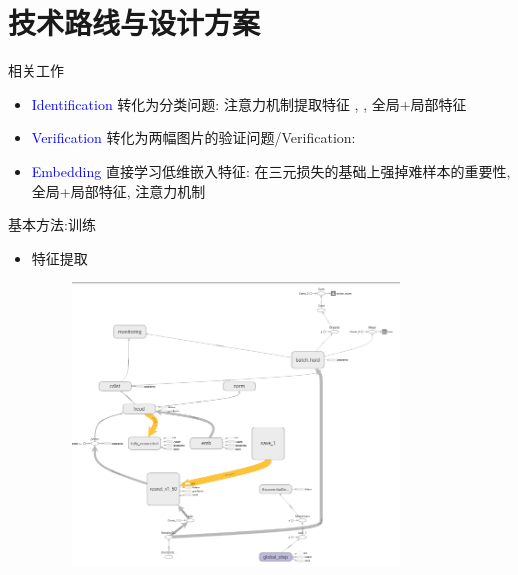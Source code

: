 \documentclass[notes]{beamer}
\begin{document}
\section{技术路线与设计方案}

\begin{frame}
	{相关工作}
	\begin{itemize}
		\item {\textcolor{blue}{Identification}} 转化为分类问题: 注意力机制提取特征 \cite{liu2017hydraplus}, \cite{zhao2017spindle}, 全局+局部特征 \cite{wei2017glad}
		\item {\textcolor{blue}{Verification}} 转化为两幅图片的验证问题/Verification: \cite{Yaqing2016}
		\item {\textcolor{blue}{Embedding}} 直接学习低维嵌入特征: 在三元损失的基础上强掉难样本的重要性\cite{hermans2017defense}, 全局+局部特征\cite{zhang2017align}, 注意力机制\cite{DBLP:journals/corr/ZhaoLWZ17} 
	\end{itemize}
\end{frame}

\begin{frame}
	{基本方法:训练} 
	\begin{itemize}
		\item 特征提取
		\begin{figure}
			\centering
			\includegraphics[width=0.82\textwidth]{2018-03-12-10-25-28.png}			
		\end{figure}		
	\end{itemize}
\end{frame}
\end{document}
